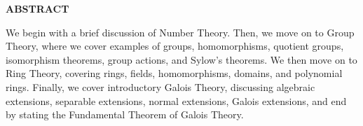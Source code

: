 \documentclass[11pt]{article}	%
\begin{document}
\coverpage

\newpage
\thispagestyle{empty}
\vspace*{\fill}
\begin{center}
    \textbf{ABSTRACT}
    
    \medskip
    \begin{minipage}{15cm}
    \begin{center}
        We begin with a brief discussion of Number Theory. Then, we move on to Group Theory, where we cover examples of groups, homomorphisms, quotient groups, isomorphism theorems, group actions, and Sylow's theorems. We then move on to Ring Theory, covering rings, fields, homomorphisms, domains, and polynomial rings. Finally, we cover introductory Galois Theory, discussing algebraic extensions, separable extensions, normal extensions, Galois extensions, and end by stating the Fundamental Theorem of Galois Theory.
    \end{center}
    \end{minipage}
    
\end{center}
\vspace*{\fill}


\thispagestyle{empty}
\tableofcontents
\pagestyle{fancy}
\setcounter{section}{-1}
\setcounter{page}{1}





















%
%
%
%

\end{document}
